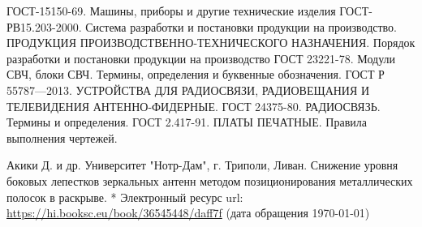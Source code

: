 \newpage

\begin{thebibliography}{3}

%





ГОСТ-15150-69. Машины, приборы и другие технические изделия
ГОСТ-РВ15.203-2000. Система разработки и постановки продукции на производство. ПРОДУКЦИЯ ПРОИЗВОДСТВЕННО-ТЕХНИЧЕСКОГО НАЗНАЧЕНИЯ. Порядок разработки и постановки продукции на производство
ГОСТ 23221-78. Модули СВЧ, блоки СВЧ. Термины, определения и буквенные обозначения.
ГОСТ Р 55787—2013. УСТРОЙСТВА ДЛЯ РАДИОСВЯЗИ, РАДИОВЕЩАНИЯ И ТЕЛЕВИДЕНИЯ АНТЕННО-ФИДЕРНЫЕ.
ГОСТ 24375-80. РАДИОСВЯЗЬ. Термины и определения.
ГОСТ 2.417-91. ПЛАТЫ ПЕЧАТНЫЕ. Правила выполнения чертежей.

Акики Д. и др. Университет "Нотр-Дам", г. Триполи, Ливан. Снижение уровня боковых лепестков зеркальных антенн методом позиционирования металлических полосок в раскрыве. * \text{[}Электронный ресурс\text{]} url: \url{https://hi.booksc.eu/book/36545448/daff7f} (дата обращения \today) %






\end{thebibliography}




